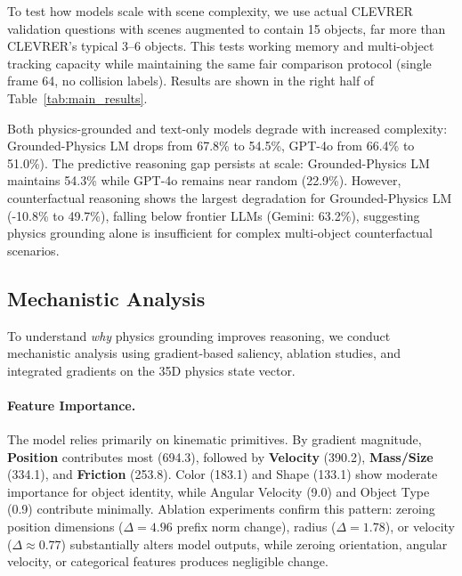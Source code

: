 \documentclass[conference]{IEEEtran}
\theoremstyle{plain}
\theoremstyle{definition}
\theoremstyle{remark}
\begin{document}
To test how models scale with scene complexity, we use actual CLEVRER validation questions with scenes augmented to contain 15 objects, far more than CLEVRER's typical 3--6 objects. This tests working memory and multi-object tracking capacity while maintaining the same fair comparison protocol (single frame 64, no collision labels). Results are shown in the right half of Table~\ref{tab:main_results}.

Both physics-grounded and text-only models degrade with increased complexity: Grounded-Physics LM drops from 67.8\% to 54.5\%, GPT-4o from 66.4\% to 51.0\%). The predictive reasoning gap persists at scale: Grounded-Physics LM maintains 54.3\% while GPT-4o remains near random (22.9\%). However, counterfactual reasoning shows the largest degradation for Grounded-Physics LM (-10.8\% to 49.7\%), falling below frontier LLMs (Gemini: 63.2\%), suggesting physics grounding alone is insufficient for complex multi-object counterfactual scenarios.

\subsection{Mechanistic Analysis}
\label{sec:mechanistic}

To understand \emph{why} physics grounding improves reasoning, we conduct mechanistic analysis using gradient-based saliency, ablation studies, and integrated gradients on the 35D physics state vector.

\paragraph{Feature Importance.} The model relies primarily on kinematic primitives. By gradient magnitude, \textbf{Position} contributes most (694.3), followed by \textbf{Velocity} (390.2), \textbf{Mass/Size} (334.1), and \textbf{Friction} (253.8). Color (183.1) and Shape (133.1) show moderate importance for object identity, while Angular Velocity (9.0) and Object Type (0.9) contribute minimally. Ablation experiments confirm this pattern: zeroing position dimensions ($\Delta=4.96$ prefix norm change), radius ($\Delta=1.78$), or velocity ($\Delta \approx 0.77$) substantially alters model outputs, while zeroing orientation, angular velocity, or categorical features produces negligible change.
\end{document}
